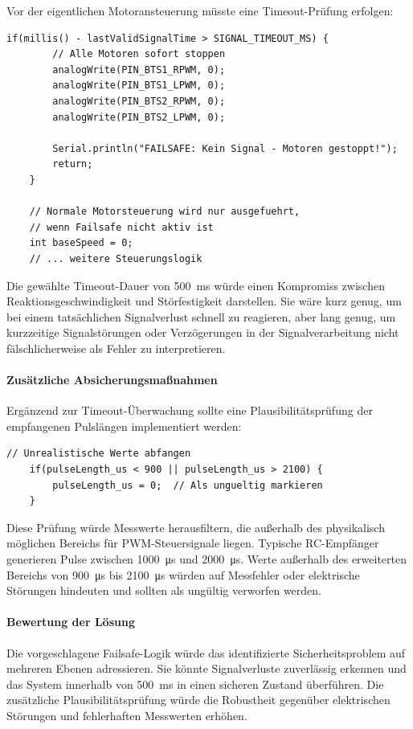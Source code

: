 Vor der eigentlichen Motoransteuerung müsste eine Timeout-Prüfung erfolgen:

\begin{lstlisting}[style=motorStyle, caption={Vorschlag für Failsafe-Aktivierung bei Signalverlust}]
	if(millis() - lastValidSignalTime > SIGNAL_TIMEOUT_MS) {
		// Alle Motoren sofort stoppen
		analogWrite(PIN_BTS1_RPWM, 0);
		analogWrite(PIN_BTS1_LPWM, 0);
		analogWrite(PIN_BTS2_RPWM, 0);
		analogWrite(PIN_BTS2_LPWM, 0);
		
		Serial.println("FAILSAFE: Kein Signal - Motoren gestoppt!");
		return;
	}
	
	// Normale Motorsteuerung wird nur ausgefuehrt, 
	// wenn Failsafe nicht aktiv ist
	int baseSpeed = 0;
	// ... weitere Steuerungslogik
\end{lstlisting}

Die gewählte Timeout-Dauer von \SI{500}{\milli\second} würde einen Kompromiss zwischen Reaktionsgeschwindigkeit und Störfestigkeit darstellen. Sie wäre kurz genug, um bei einem tatsächlichen Signalverlust schnell zu reagieren, aber lang genug, um kurzzeitige Signalstörungen oder Verzögerungen in der Signalverarbeitung nicht fälschlicherweise als Fehler zu interpretieren.

\paragraph{Zusätzliche Absicherungsmaßnahmen}
Ergänzend zur Timeout-Überwachung sollte eine Plausibilitätsprüfung der empfangenen Pulslängen implementiert werden:

\begin{lstlisting}[style=motorStyle, caption={Vorschlag für Validierung der Signalplausibilität}]
	// Unrealistische Werte abfangen
	if(pulseLength_us < 900 || pulseLength_us > 2100) {
		pulseLength_us = 0;  // Als ungueltig markieren
	}
\end{lstlisting}

Diese Prüfung würde Messwerte herausfiltern, die außerhalb des physikalisch möglichen Bereichs für PWM-Steuersignale liegen. Typische RC-Empfänger generieren Pulse zwischen \SI{1000}{\micro\second} und \SI{2000}{\micro\second}. Werte außerhalb des erweiterten Bereichs von \SI{900}{\micro\second} bis \SI{2100}{\micro\second} würden auf Messfehler oder elektrische Störungen hindeuten und sollten als ungültig verworfen werden.

\paragraph{Bewertung der Lösung}
Die vorgeschlagene Failsafe-Logik würde das identifizierte Sicherheitsproblem auf mehreren Ebenen adressieren. Sie könnte Signalverluste zuverlässig erkennen und das System innerhalb von \SI{500}{\milli\second} in einen sicheren Zustand überführen. Die zusätzliche Plausibilitätsprüfung würde die Robustheit gegenüber elektrischen Störungen und fehlerhaften Messwerten erhöhen.

